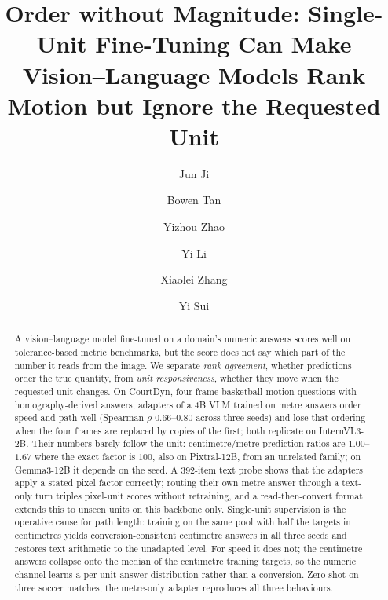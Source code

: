 \documentclass[preprint,number]{elsarticle}
\begin{document}
\begin{frontmatter}

\title{Order without Magnitude: Single-Unit Fine-Tuning Can Make
       Vision--Language Models Rank Motion but Ignore the Requested Unit}

\author[qdu]{Jun Ji}
\author[hkust]{Bowen Tan}
\author[ruc]{Yizhou Zhao}
\author[qdu]{Yi Li}
\author[qdu]{Xiaolei Zhang}
\author[qdu]{Yi Sui}
\address[qdu]{College of Computer Science and Technology, Qingdao University,
  308 Ningxia Road, Qingdao 266071, China}
\address[hkust]{Department of Computer Science and Engineering, The Hong Kong
  University of Science and Technology, Clear Water Bay, Kowloon, Hong Kong SAR,
  China}
\address[ruc]{Renmin University of China, Beijing 100872, China}

\begin{abstract}
A vision--language model fine-tuned on a domain's numeric answers scores well
on tolerance-based metric benchmarks, but the score does not say which part
of the number it reads from the image. We separate
\emph{rank agreement}, whether predictions order the true quantity, from
\emph{unit responsiveness}, whether they move when the requested unit changes.
On CourtDyn, four-frame basketball motion questions with homography-derived
answers, adapters of a 4B VLM trained on metre answers order speed and path well (Spearman $\rho$
$0.66$--$0.80$ across three seeds) and lose that ordering when the four frames
are replaced by copies of the first; both replicate on InternVL3-2B. Their
numbers barely follow the unit: centimetre/metre prediction ratios are $1.00$--$1.67$ where the exact
factor is $100$, also on Pixtral-12B, from an unrelated family; on
Gemma3-12B it depends on the seed. A
392-item text probe shows that the adapters apply a
stated pixel factor correctly; routing their own metre answer through a
text-only turn triples pixel-unit scores without retraining, and a
read-then-convert format extends this to unseen units on this backbone only. Single-unit
supervision is the operative cause for path length: training on the same pool
with half the targets in centimetres yields conversion-consistent centimetre
answers in all three seeds and restores text arithmetic to the unadapted
level. For speed it does
not; the centimetre answers collapse onto the median of the centimetre training
targets, so the numeric channel learns a per-unit answer distribution rather
than a conversion. Zero-shot on three soccer matches, the metre-only adapter
reproduces all three behaviours.
\end{abstract}


\end{frontmatter}
\end{document}
